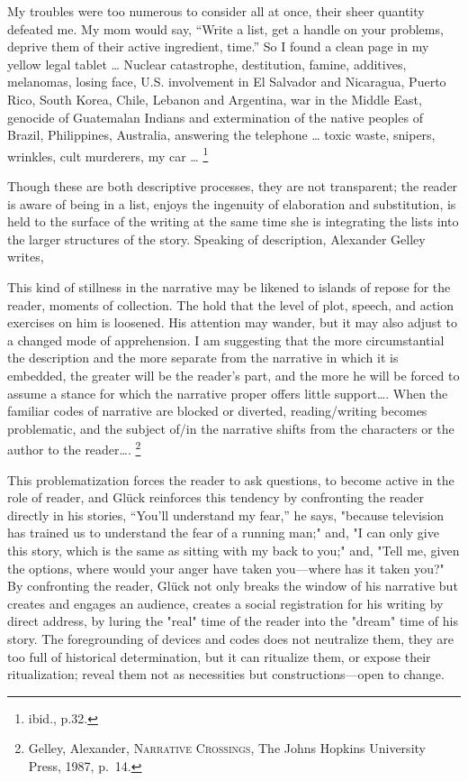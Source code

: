 \documentclass[
]{memoir}
\begin{document}
My troubles were too numerous to consider all at once, their sheer
quantity defeated me. My mom would say, ``Write a list, get a handle on
your problems, deprive them of their active ingredient, time.'' So I
found a clean page in my yellow legal tablet \ldots{} Nuclear
catastrophe, destitution, famine, additives, melanomas, losing face,
U.S. involvement in El Salvador and Nicaragua, Puerto Rico, South Korea,
Chile, Lebanon and Argentina, war in the Middle East, genocide of
Guatemalan Indians and extermination of the native peoples of Brazil,
Philippines, Australia, answering the telephone \ldots{} toxic waste,
snipers, wrinkles, cult murderers, my car \ldots{} \footnote{ibid.,
  p.32.}

Though these are both descriptive processes, they are not transparent;
the reader is aware of being in a list, enjoys the ingenuity of
elaboration and substitution, is held to the surface of the writing at
the same time she is integrating the lists into the larger structures of
the story. Speaking of description, Alexander Gelley writes,

This kind of stillness in the narrative may be likened to islands of
repose for the reader, moments of collection. The hold that the level of
plot, speech, and action exercises on him is loosened. His attention may
wander, but it may also adjust to a changed mode of apprehension. I am
suggesting that the more circumstantial the description and the more
separate from the narrative in which it is embedded, the greater will be
the reader's part, and the more he will be forced to assume a stance for
which the narrative proper offers little support\ldots{}. When the
familiar codes of narrative are blocked or diverted, reading/writing
becomes problematic, and the subject of/in the narrative shifts from the
characters or the author to the reader\ldots{}. \footnote{Gelley,
  Alexander, \textsc{Narrative Crossings}, The Johns Hopkins University
  Press, 1987, p.~14.}

This problematization forces the reader to ask questions, to become
active in the role of reader, and Glück reinforces this tendency by
confronting the reader directly in his stories, ``You'll understand my
fear,'' he says, "because television has trained us to understand the
fear of a running man;" and, "I can only give this story, which is the
same as sitting with my back to you;" and, "Tell me, given the options,
where would your anger have taken you---where has it taken you?" By
confronting the reader, Glück not only breaks the window of his
narrative but creates and engages an audience, creates a social
registration for his writing by direct address, by luring the "real"
time of the reader into the "dream" time of his story. The foregrounding
of devices and codes does not neutralize them, they are too full of
historical determination, but it can ritualize them, or expose their
ritualization; reveal them not as necessities but constructions---open
to change.
\end{document}
